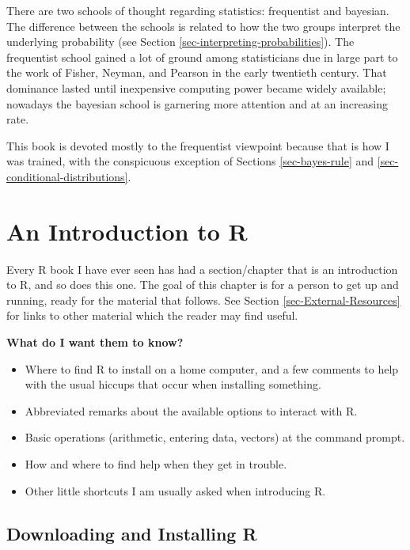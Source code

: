 \documentclass[]{book}
\providecommand{\tightlist}{%
  \setlength{\itemsep}{0pt}\setlength{\parskip}{0pt}}
\numberwithin{equation}{chapter}
\numberwithin{figure}{chapter}
\theoremstyle{plain}
\theoremstyle{definition}
\theoremstyle{remark}
\theoremstyle{definition}
\theoremstyle{definition}
\theoremstyle{remark}
\begin{document}
There are two schools of thought regarding statistics: frequentist and
bayesian. The difference between the schools is related to how the two
groups interpret the underlying probability (see Section
\ref{sec-interpreting-probabilities}). The frequentist school gained a
lot of ground among statisticians due in large part to the work of
Fisher, Neyman, and Pearson in the early twentieth century. That
dominance lasted until inexpensive computing power became widely
available; nowadays the bayesian school is garnering more attention and
at an increasing rate.

This book is devoted mostly to the frequentist viewpoint because that is
how I was trained, with the conspicuous exception of Sections
\ref{sec-bayes-rule} and \ref{sec-conditional-distributions}.

\chapter{An Introduction to R}\label{cha-introduction-to-R}

Every R book I have ever seen has had a section/chapter that is an
introduction to R, and so does this one. The goal of this chapter is for
a person to get up and running, ready for the material that follows. See
Section \ref{sec-External-Resources} for links to other material which
the reader may find useful.

\textbf{What do I want them to know?}

\begin{itemize}
\tightlist
\item
  Where to find R to install on a home computer, and a few comments to
  help with the usual hiccups that occur when installing something.
\item
  Abbreviated remarks about the available options to interact with R.
\item
  Basic operations (arithmetic, entering data, vectors) at the command
  prompt.
\item
  How and where to find help when they get in trouble.
\item
  Other little shortcuts I am usually asked when introducing R.
\end{itemize}

\section{Downloading and Installing R}\label{sec-download-install-R}
\end{document}
